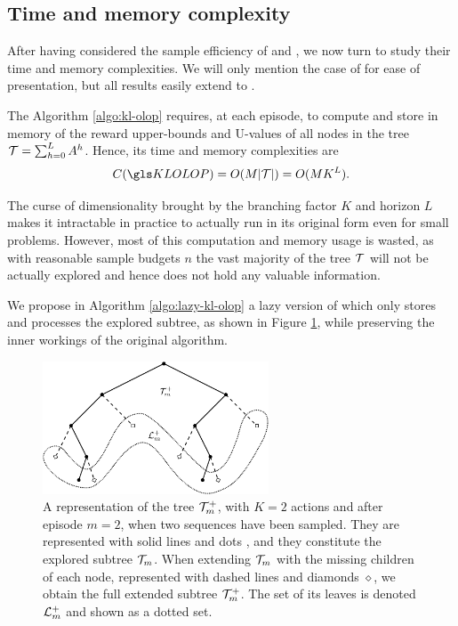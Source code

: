 \subsection{Time and memory complexity}
\label{sec:time-complexity}

After having considered the sample efficiency of \OLOP and \KLOLOP, we now turn to study their time and memory complexities. We will only mention the case of \KLOLOP for ease of presentation, but all results easily extend to \OLOP.

The Algorithm \ref{algo:kl-olop} requires, at each episode, to compute and store in memory of the reward upper-bounds and U-values of all nodes in the tree $\mathcal{T} = \sum_{h=0}^L A^h$.
Hence, its time and memory complexities are 
\begin{equation}
C(\KLOLOP) = O(M|\Tau|) = O(MK^L).
\end{equation}

The curse of dimensionality brought by the branching factor $K$ and horizon $L$ makes it intractable in practice to actually run \KLOLOP in its original form even for small problems. However, most of this computation and memory usage is wasted, as with reasonable sample budgets $n$ the vast majority of the tree $\mathcal{T}$ will not be actually explored and hence does not hold any valuable information.

We propose in Algorithm \ref{algo:lazy-kl-olop} a lazy version of \KLOLOP which only stores and processes the explored subtree, as shown in Figure \ref{fig:tree}, while preserving the inner workings of the original algorithm.

\begin{figure}[ht]
	\centering
	\includegraphics[width=0.6\textwidth]{img/tree_svg-tex}
	\caption{A representation of the tree $\mathcal{T}_m^+$, with $K = 2$ actions and after episode $m = 2$, when two sequences have been sampled. They are represented with solid lines and dots \textbullet, and they constitute the explored subtree $\mathcal{T}_m$. When extending $\mathcal{T}_m$ with the missing children of each node, represented with dashed lines and diamonds $\diamond$, we obtain the full extended subtree $\mathcal{T}_m^+$. The set of its leaves is denoted $\mathcal{L}_m^+$ and shown as a dotted set.}
	\label{fig:tree}
\end{figure}

